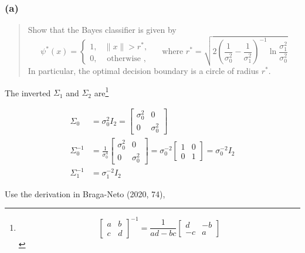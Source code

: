 \documentclass[
  letterpaper,
  DIV=11,
  numbers=noendperiod]{scrartcl}
\begin{document}
\hypertarget{a-1}{%
\subsubsection{(a)}\label{a-1}}

\begin{quote}
Show that the Bayes classifier is given by \begin{equation}
\psi^{*}(x) = 
\begin{cases}
1, &\|x\| > r^{*},\\
0, &\text{ otherwise },
\end{cases}
\quad \text{ where } r^{*} = \sqrt{2\left(\frac{1}{\sigma_{0}^{2}} - \frac{1}{\sigma_{1}^{2}}\right)^{-1}\ln\frac{\sigma^{2}_{1}}{\sigma^{2}_{0}}}
\end{equation} In particular, the optimal decision boundary is a circle
of radius \(r^{*}\).
\end{quote}

The inverted \(\Sigma_1\) and \(\Sigma_2\) are\footnote{\begin{equation}\begin{bmatrix}
  a & b\\ 
  c & d
  \end{bmatrix}^{-1} = \frac{1}{ad-bc}\begin{bmatrix}
  d & -b\\ 
  -c & a
  \end{bmatrix}
  \end{equation}}

\begin{align}
    \Sigma_0 &= \sigma_{0}^2 I_2 = \begin{bmatrix}
        \sigma_{0}^2 & 0 \\
        0 & \sigma_{0}^2
    \end{bmatrix}\\ 
    \Sigma_{0}^{-1} &= \frac{1}{\sigma_{0}^{4}} \begin{bmatrix}
        \sigma_{0}^2 & 0 \\
        0 & \sigma_{0}^2
    \end{bmatrix} = \sigma_{0}^{-2}\begin{bmatrix}
            1 & 0\\
            0 & 1
        \end{bmatrix} = \sigma^{-2}_{0}I_2\\
    \Sigma^{-1}_{1} &= \sigma^{-2}_{1}I_2
\end{align}

Use the derivation in Braga-Neto (2020, 74),
\end{document}
